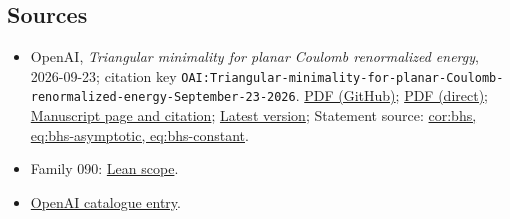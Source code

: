 \documentclass[11pt]{article}
\begin{document}
\subsection{Sources}
\begin{itemize}
\item OpenAI, \emph{Triangular minimality for planar Coulomb renormalized energy}, 2026-09-23; citation key \texttt{OAI:Triangular-minimality-for-planar-Coulomb-renormalized-energy-September-23-2026}. \href{https://github.com/openai/math/blob/adc7f1241b42e322a6451854ab7e4b4c146bf78a/preprints/Triangular-minimality-for-planar-Coulomb-renormalized-energy-September-23-2026/paper.pdf}{PDF (GitHub)}; \href{https://github.com/openai/math/raw/adc7f1241b42e322a6451854ab7e4b4c146bf78a/preprints/Triangular-minimality-for-planar-Coulomb-renormalized-energy-September-23-2026/paper.pdf}{PDF (direct)}; \href{https://github.com/openai/math/blob/adc7f1241b42e322a6451854ab7e4b4c146bf78a/preprints/Triangular-minimality-for-planar-Coulomb-renormalized-energy-September-23-2026/README.md}{Manuscript page and citation}; \href{https://github.com/openai/math/blob/main/preprints/Triangular-minimality-for-planar-Coulomb-renormalized-energy-September-23-2026/paper.pdf}{Latest version}; Statement source: \href{https://github.com/openai/math/blob/adc7f1241b42e322a6451854ab7e4b4c146bf78a/preprints/Triangular-minimality-for-planar-Coulomb-renormalized-energy-September-23-2026/build/sections/01-introduction.tex\#L105}{cor:bhs, eq:bhs-asymptotic, eq:bhs-constant}.
\item Family 090: \href{https://github.com/openai/math/blob/adc7f1241b42e322a6451854ab7e4b4c146bf78a/lean/docs/090.md}{Lean scope}.
\item \href{https://github.com/openai/math/blob/adc7f1241b42e322a6451854ab7e4b4c146bf78a/CONTENTS.md}{OpenAI catalogue entry}.
\end{itemize}
\end{document}
